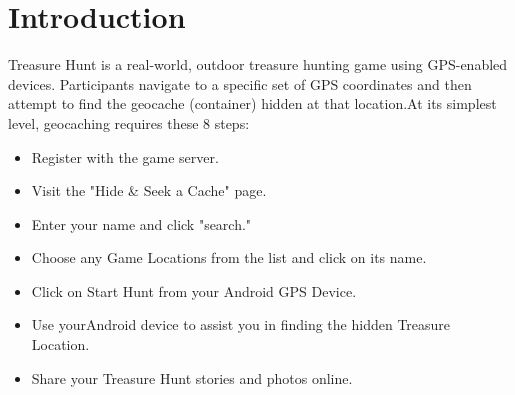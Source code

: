 	\makeatletter
	\def\@makechapterhead#1{%
	  \vspace*{50\p@}%
	  {\parindent \z@ \centering\normalfont
	    \ifnum \c@secnumdepth >\m@ne
	      \if@mainmatter
	         \large\bfseries \@chapapp\space \thechapter
	        \par\nobreak
	        \vskip 20\p@
	      \fi
	    \fi
	    \interlinepenalty\@M
	     \large \bfseries #1\par\nobreak
	
	    \vskip 40\p@
	  }}
	\def\@makeschapterhead#1{%
	  \vspace*{50\p@}%
	  {\parindent \z@ \centering 
	    \normalfont
	    \interlinepenalty\@M
	    \large\bfseries  #1\par\nobreak
	    \vskip 40\p@
	  }}
	\makeatother
 
            \sectionfont{\fontsize{12}}

	\titlespacing*{\chapter}{0pt}{0pt}{12pt}
	

\chapter{ Introduction}
	Treasure Hunt is a real-world, outdoor treasure hunting game using GPS-enabled devices. Participants navigate to a specific set of GPS coordinates and then attempt to find the geocache (container) hidden at that location.At its simplest level, geocaching requires these 8 steps:
	\begin{itemize}
	
	
	
	  \item Register with the game server.
	  \item Visit the "Hide & Seek a Cache" page.
	  \item Enter your name  and click "search."
	  \item Choose any Game Locations from the list and click on its name.
	  \item Click on Start Hunt from your Android  GPS Device.
	  \item Use yourAndroid  device to assist you in finding the hidden Treasure Location.
	   \item Share your Treasure Hunt stories and photos online.
	 
	\end{itemize}
	
